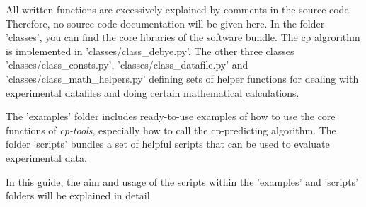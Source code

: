%
All written functions are excessively explained by comments in the source code. Therefore, no source code documentation will be given here. In the folder 'classes', you can find the core libraries of the software bundle. The cp algrorithm \cite{Zienert2018} is implemented in 'classes/class\_debye.py'. The other three classes 'classes/class\_consts.py', 'classes/class\_datafile.py' and 'classes/class\_math\_helpers.py' defining sets of helper functions for dealing with experimental datafiles and doing certain mathematical calculations.

The 'examples' folder includes ready-to-use examples of how to use the core functions of \emph{cp-tools}, especially how to call the cp-predicting algorithm. The folder 'scripts' bundles a set of helpful scripts that can be used to evaluate experimental data.

In this guide, the aim and usage of the scripts within the 'examples' and 'scripts' folders will be explained in detail.
